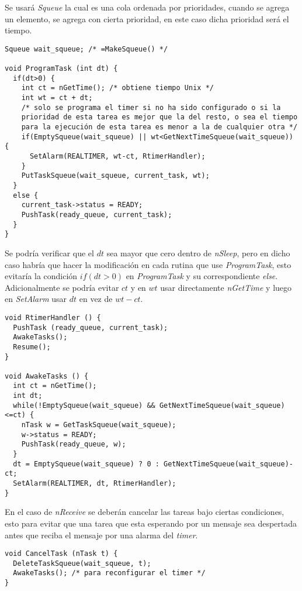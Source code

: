 Se usará \textit{Squeue} la cual es una cola ordenada por prioridades, cuando se agrega un elemento, se agrega con cierta prioridad, en este caso dicha prioridad será el tiempo.

\begin{verbatim}
Squeue wait_squeue; /* =MakeSqueue() */

void ProgramTask (int dt) {
  if(dt>0) {
    int ct = nGetTime(); /* obtiene tiempo Unix */
    int wt = ct + dt;
    /* solo se programa el timer si no ha sido configurado o si la
    prioridad de esta tarea es mejor que la del resto, o sea el tiempo
    para la ejecución de esta tarea es menor a la de cualquier otra */
    if(EmptySqueue(wait_squeue) || wt<GetNextTimeSqueue(wait_squeue)) {
      SetAlarm(REALTIMER, wt-ct, RtimerHandler);
    }
    PutTaskSqueue(wait_squeue, current_task, wt);
  }
  else {
    current_task->status = READY;
    PushTask(ready_queue, current_task);
  }
}
\end{verbatim}

Se podría verificar que el $dt$ sea mayor que cero dentro de \textit{nSleep}, pero en dicho caso habría que hacer la modificación en cada rutina que use \textit{ProgramTask}, esto evitaría la condición $if(dt>0)$ en \textit{ProgramTask} y su correspondiente \textit{else}. Adicionalmente se podría evitar $ct$ y en $wt$ usar directamente \textit{nGetTime} y luego en \textit{SetAlarm} usar $dt$ en vez de $wt-ct$.

\begin{verbatim}
void RtimerHandler () {
  PushTask (ready_queue, current_task);
  AwakeTasks();
  Resume();
}

void AwakeTasks () {
  int ct = nGetTime();
  int dt;
  while(!EmptySqueue(wait_squeue) && GetNextTimeSqueue(wait_squeue)<=ct) {
    nTask w = GetTaskSqueue(wait_squeue);
    w->status = READY;
    PushTask(ready_queue, w);
  }
  dt = EmptySqueue(wait_squeue) ? 0 : GetNextTimeSqueue(wait_squeue)-ct;
  SetAlarm(REALTIMER, dt, RtimerHandler);
}
\end{verbatim}

En el caso de \textit{nReceive} se deberán cancelar las tareas bajo ciertas condiciones, esto para evitar que una tarea que esta esperando por un mensaje sea despertada antes que reciba el mensaje por una alarma del \textit{timer}.

\begin{verbatim}
void CancelTask (nTask t) {
  DeleteTaskSqueue(wait_squeue, t);
  AwakeTasks(); /* para reconfigurar el timer */
}
\end{verbatim}

